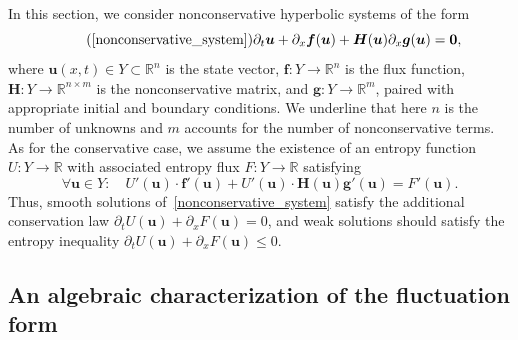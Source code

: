 \documentclass[]{scrartcl}
\renewcommand{\vec}[1]{\boldsymbol{#1}}
\theoremstyle{definition}
\begin{document}
In this section, we consider nonconservative hyperbolic systems of the form
\begin{equation}
\tag{\ref{nonconservative_system}}
    \partial_t \vec{u} + \partial_x \vec{f}(\vec{u}) + \vec{H}(\vec{u}) \partial_x \vec{g}(\vec{u}) = \vec{0},
\end{equation}
where $\vec{u}(x,t) \in Y \subset \mathbb{R}^n$ is the state vector, $\vec{f}\colon Y \to \mathbb{R}^n$ is the flux function, $\vec{H}\colon Y \to \mathbb{R}^{n \times m}$ is the nonconservative matrix, and $\vec{g}\colon Y \to \mathbb{R}^m$, paired with appropriate initial and boundary conditions.
We underline that here $n$ is the number of unknowns and $m$ accounts for the number of nonconservative terms.
As for the conservative case, we assume the existence of an entropy function $U\colon Y \to \mathbb{R}$ with associated entropy flux $F\colon Y \to \mathbb{R}$ satisfying
\begin{equation}\label{compatibility_condition_nc}
\forall \vec{u} \in Y\colon \quad U'(\vec{u}) \cdot \vec{f}'(\vec{u}) + U'(\vec{u}) \cdot \vec{H}(\vec{u}) \vec{g}'(\vec{u}) = F'(\vec{u}).
\end{equation}
Thus, smooth solutions of~\eqref{nonconservative_system} satisfy the additional conservation law
$\partial_t U(\vec{u}) + \partial_x F(\vec{u}) = 0$,
and weak solutions should satisfy the entropy inequality
$\partial_t U(\vec{u}) + \partial_x F(\vec{u}) \leq 0$.


\subsection{An algebraic characterization of the fluctuation form}
\end{document}
